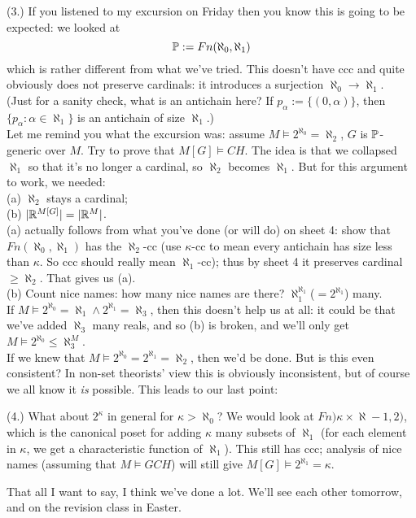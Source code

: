 \documentclass[a4paper]{article}
\begin{document}
(3.) If you listened to my excursion on Friday then you know this is going to be expected: we looked at 
\[
\P:=Fn(\aleph_0,\aleph_1)
\]
which is rather different from what we've tried. This doesn't have ccc and quite obviously does not preserve cardinals: it introduces a surjection $\aleph_0 \to \aleph_1$.\\
(Just for a sanity check, what is an antichain here? If $p_\alpha :=\{(0,\alpha)\}$, then $\{p_\alpha:\alpha \in \aleph_1\}$ is an antichain of size $\aleph_1$.)\\
Let me remind you what the excursion was: assume $M \vDash 2^{\aleph_0} = \aleph_2$, $G$ is $\P$-generic over $M$. Try to prove that $M[G] \vDash CH$. The idea is that we collapsed $\aleph_1$ so that it's no longer a cardinal, so $\aleph_2$ becomes $\aleph_1$. But for this argument to work, we needed:\\
(a) $\aleph_2$ stays a cardinal;\\
(b) $|\R^{M[G]}| = |\R^M|$.\\
(a) actually follows from what you've done (or will do) on sheet 4: show that $Fn(\aleph_0,\aleph_1)$ has the $\aleph_2$-cc (use $\kappa$-cc to mean every antichain has size less than $\kappa$. So ccc should really mean $\aleph_1$-cc); thus by sheet 4 it preserves cardinal $\geq \aleph_2$. That gives us (a).\\
(b) Count nice names: how many nice names are there? $\aleph_1^{\aleph_1}$($=2^{\aleph_1}$) many.\\
If $M \vDash 2^{\aleph_0} = \aleph_1 \wedge 2^{\aleph_1} = \aleph_3$, then this doesn't help us at all: it could be that we've added $\aleph_3$ many reals, and so (b) is broken, and we'll only get $M \vDash 2^{\aleph_0} \leq \aleph_3^M$.\\
If we knew that $M \vDash 2^{\aleph_0} = 2^{\aleph_1} = \aleph_2$, then we'd be done. But is this even consistent? In non-set theorists' view this is obviously inconsistent, but of course we all know it \emph{is} possible. This leads to our last point:

(4.) What about $2^\kappa$ in general for $\kappa > \aleph_0$? We would look at $Fn)\kappa \times \aleph-1,2)$, which is the canonical poset for adding $\kappa$ many subsets of $\aleph_1$ (for each element in $\kappa$, we get a characteristic function of $\aleph_1$). This still has ccc; analysis of nice names (assuming that $M \vDash GCH$) will still give $M[G] \vDash 2^{\aleph_1} = \kappa$.

That all I want to say, I think we've done a lot. We'll see each other tomorrow, and on the revision class in Easter.
\end{document}
